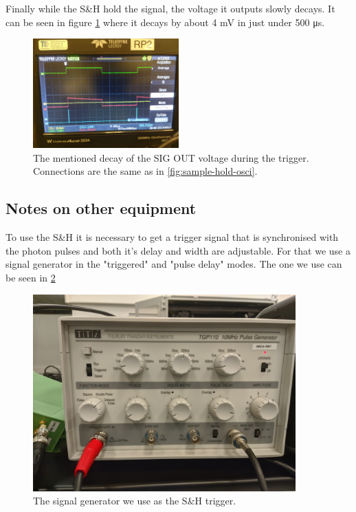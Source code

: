 \documentclass[a4paper, 10pt]{article}
\begin{document}
Finally while the S\&H hold the signal, the voltage it outputs slowly decays.
It can be seen in figure \cref{fig:sample-hold-decay} where it decays by about 4 \si{\milli\volt} in just under 500 \si{\micro\second}.

\begin{figure}[H]
    \centering
    \includegraphics[width=0.5\textwidth]{../images/sample-hold-decay.jpg}
    \caption{The mentioned decay of the SIG OUT voltage during the trigger. Connections are the same as in \cref{fig:sample-hold-osci}.}
    \label{fig:sample-hold-decay}
\end{figure}

\subsection{Notes on other equipment}
To use the S\&H it is necessary to get a trigger signal that is synchronised with the photon pulses and both it's delay and width are adjustable.
For that we use a signal generator in the "triggered" and "pulse delay" modes.
The one we use can be seen in \cref{fig:signal-generator}

\begin{figure}[H]
    \centering
    \includegraphics[width=0.9\textwidth]{../images/signal-generator.jpg}
    \caption{The signal generator we use as the S\&H trigger.}
    \label{fig:signal-generator}
\end{figure}
\end{document}
